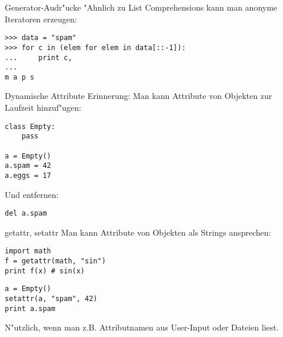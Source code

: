 \begin{frame}[fragile]{Generator-Audr"ucke}
"Ahnlich zu List Comprehensions kann man anonyme Iteratoren erzeugen:
\begin{lstlisting}[style=Shell]
>>> data = "spam"
>>> for c in (elem for elem in data[::-1]):
...     print c,
...
m a p s
\end{lstlisting}
\end{frame}


\begin{frame}[fragile]{Dynamische Attribute}
Erinnerung: Man kann Attribute von Objekten zur Laufzeit hinzuf"ugen:
\begin{lstlisting}
class Empty:
    pass

a = Empty()
a.spam = 42
a.eggs = 17
\end{lstlisting}
\vspace{2mm}
Und entfernen:
\begin{lstlisting}
del a.spam
\end{lstlisting}
\end{frame}

\begin{frame}[fragile]{getattr, setattr}
Man kann Attribute von Objekten als Strings ansprechen:
\begin{lstlisting}
import math
f = getattr(math, "sin")
print f(x) # sin(x)
\end{lstlisting}
\vspace{2mm}
\begin{lstlisting}
a = Empty()
setattr(a, "spam", 42)
print a.spam
\end{lstlisting}
N"utzlich, wenn man z.B. Attributnamen aus User-Input oder Dateien liest.
\end{frame}

